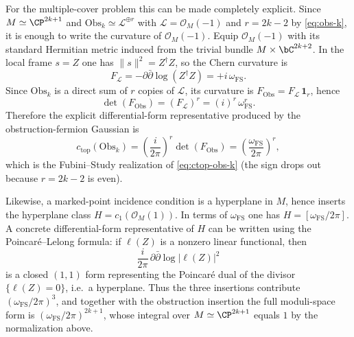 \documentclass[12pt]{article}
\begin{document}
For the multiple-cover problem this can be made completely explicit. Since
$M\simeq\CP^{2k+1}$ and $\mathrm{Obs}_k\simeq\mathcal{L}^{\oplus r}$ with
$\mathcal{L}=\mathcal{O}_M(-1)$ and $r=2k-2$ by \eqref{eq:obs-k}, it is enough
to write the curvature of $\mathcal{O}_M(-1)$. Equip $\mathcal{O}_M(-1)$ with
its standard Hermitian metric induced from the trivial bundle
$M\times\bC^{2k+2}$. In the local frame $s=Z$ one has $\|s\|^2=Z^\dagger Z$, so
the Chern curvature is
\begin{equation*}
  F_{\mathcal{L}}=-\partial\bar\partial \log(Z^\dagger Z)
  = + i\,\omega_{\mathrm{FS}}.
\end{equation*}
Since $\mathrm{Obs}_k$ is a direct sum of $r$ copies of $\mathcal{L}$, its
curvature is $F_{\mathrm{Obs}}=F_{\mathcal{L}}\,\mathbf{1}_r$, hence
\begin{equation*}
  \det(F_{\mathrm{Obs}}) = (F_{\mathcal{L}})^r = (i)^r\,\omega_{\mathrm{FS}}^r.
\end{equation*}
Therefore the explicit differential-form representative produced by the
obstruction-fermion Gaussian is
\begin{equation*}
  c_{\mathrm{top}}(\mathrm{Obs}_k)
  = \left(\frac{i}{2\pi}\right)^r \det(F_{\mathrm{Obs}})
  = \left(\frac{\omega_{\mathrm{FS}}}{2\pi}\right)^r,
\end{equation*}
which is the Fubini--Study realization of \eqref{eq:ctop-obs-k} (the sign drops
out because $r=2k-2$ is even).

Likewise, a marked-point incidence condition is a hyperplane in $M$, hence
inserts the hyperplane class $H=c_1(\mathcal{O}_M(1))$. In terms of
$\omega_{\mathrm{FS}}$ one has $H=[\omega_{\mathrm{FS}}/2\pi]$. A concrete
differential-form representative of $H$ can be written using the
Poincar\'e--Lelong formula: if $\ell(Z)$ is a nonzero linear functional, then
\begin{equation*}
  \frac{i}{2\pi}\,\partial\bar\partial \log|\ell(Z)|^2
\end{equation*}
is a closed $(1,1)$ form representing the Poincar\'e dual of the divisor
$\{\ell(Z)=0\}$, i.e.\ a hyperplane. Thus the three insertions contribute
$(\omega_{\mathrm{FS}}/2\pi)^3$, and together with the obstruction insertion the
full moduli-space form is $(\omega_{\mathrm{FS}}/2\pi)^{2k+1}$, whose integral
over $M\simeq\CP^{2k+1}$ equals $1$ by the normalization above.
\end{document}
